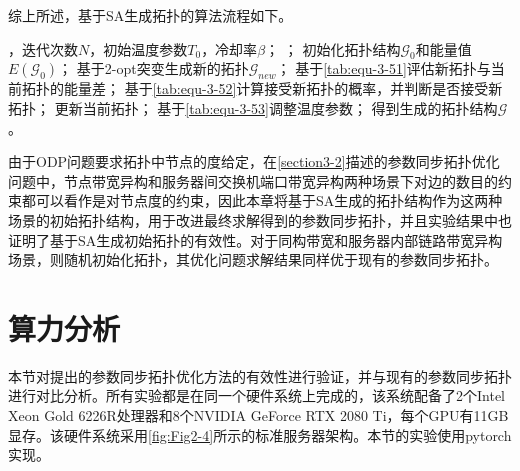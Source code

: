 综上所述，基于SA生成拓扑的算法流程如下。
\begin{center}
    \begin{algorithm}[!htbp]
        \caption{基于SA生成拓扑的算法流程} 
        \label{Algorithm-SA} 
        \begin{algorithmic}[1]
        ，迭代次数$N$，初始温度参数$T_0$，冷却率$\beta$；
        ；
        \STATE 初始化拓扑结构$\mathcal{G}_0$和能量值$E\left(\mathcal{G}_0\right)$；
            \STATE 基于2-opt突变生成新的拓扑$\mathcal{G} _{new}$；
            \STATE 基于\autoref{tab:equ-3-51}评估新拓扑与当前拓扑的能量差；
            \STATE 基于\autoref{tab:equ-3-52}计算接受新拓扑的概率，并判断是否接受新拓扑；
                \STATE 更新当前拓扑；
                \STATE 基于\autoref{tab:equ-3-53}调整温度参数；
            \ENDIF
        \ENDFOR
        \STATE 得到生成的拓扑结构$\mathcal{G}$。
    \end{algorithmic}
    \end{algorithm}
\end{center}

由于ODP问题要求拓扑中节点的度给定，在\autoref{section3-2}描述的参数同步拓扑优化问题中，节点带宽异构和服务器间交换机端口带宽异构两种场景下对边的数目的约束都可以看作是对节点度的约束，因此本章将基于SA生成的拓扑结构作为这两种场景的初始拓扑结构，用于改进最终求解得到的参数同步拓扑，并且实验结果中也证明了基于SA生成初始拓扑的有效性。对于同构带宽和服务器内部链路带宽异构场景，则随机初始化拓扑，其优化问题求解结果同样优于现有的参数同步拓扑。

\section{算力分析}
本节对提出的参数同步拓扑优化方法的有效性进行验证，并与现有的参数同步拓扑进行对比分析。所有实验都是在同一个硬件系统上完成的，该系统配备了2个Intel Xeon Gold 6226R处理器和8个NVIDIA GeForce RTX 2080 Ti，每个GPU有11GB显存。该硬件系统采用\autoref{fig:Fig2-4}所示的标准服务器架构。本节的实验使用pytorch实现。

